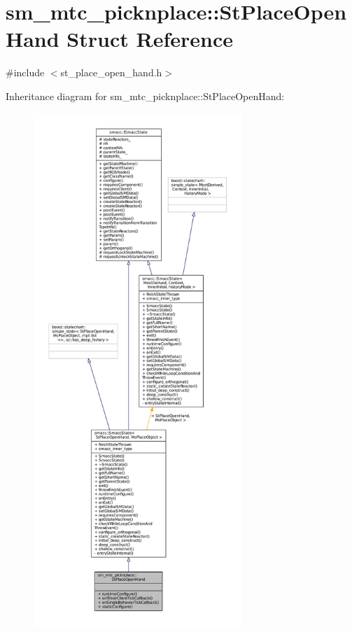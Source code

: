 \hypertarget{structsm__mtc__picknplace_1_1StPlaceOpenHand}{}\section{sm\+\_\+mtc\+\_\+picknplace\+:\+:St\+Place\+Open\+Hand Struct Reference}
\label{structsm__mtc__picknplace_1_1StPlaceOpenHand}


{\ttfamily \#include $<$st\+\_\+place\+\_\+open\+\_\+hand.\+h$>$}



Inheritance diagram for sm\+\_\+mtc\+\_\+picknplace\+:\+:St\+Place\+Open\+Hand\+:
\nopagebreak
\begin{figure}[H]
\begin{center}
\leavevmode
\includegraphics[height=550pt]{structsm__mtc__picknplace_1_1StPlaceOpenHand__inherit__graph}
\end{center}
\end{figure}



